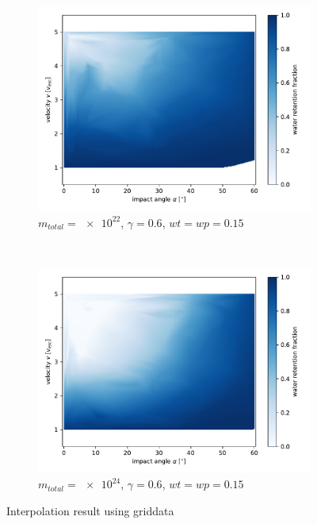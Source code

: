 \begin{figure}[h!] %
	\centering
	\begin{subfigure}[t]{0.5\textwidth}
		\centering
		\includegraphics[width=\linewidth]{images/plots/griddata1.pdf}
		\caption{$m_{total}=\num{e22}$, $\gamma=0.6$, $wt=wp=0.15$}
		\label{fig:griddata1}
	\end{subfigure}%
	~ 
	\begin{subfigure}[t]{0.5\textwidth}
		\centering
		\includegraphics[width=\linewidth]{images/plots/griddata2.pdf}
		\caption{$m_{total}=\num{e24}$, $\gamma=0.6$, $wt=wp=0.15$}
		\label{fig:griddata2}
	\end{subfigure}
	\caption{Interpolation result using griddata}
	\label{fig:griddataresults}
\end{figure}
